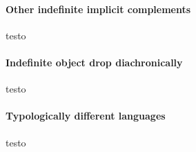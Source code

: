 \paragraph{Other indefinite implicit complements}
testo


\paragraph{Indefinite object drop diachronically}
testo



\paragraph{Typologically different languages}

testo



